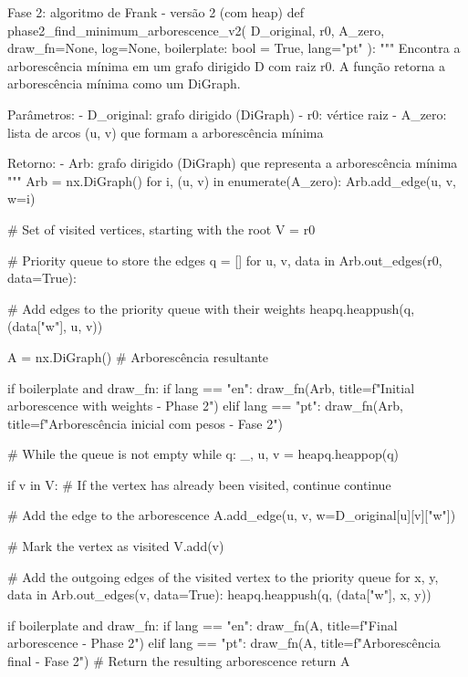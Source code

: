 \begin{pybox}{Fase 2: algoritmo de Frank - versão 2 (com heap)}
	def phase2_find_minimum_arborescence_v2(
	D_original, r0, A_zero, draw_fn=None, log=None, boilerplate: bool = True, lang="pt"
	):
	"""
	Encontra a arborescência mínima em um grafo dirigido D com raiz r0.
	A função retorna a arborescência mínima como um DiGraph.

	Parâmetros:
	- D_original: grafo dirigido (DiGraph)
	- r0: vértice raiz
	- A_zero: lista de arcos (u, v) que formam a arborescência mínima

	Retorno:
	- Arb: grafo dirigido (DiGraph) que representa a arborescência mínima
	"""
	Arb = nx.DiGraph()
	for i, (u, v) in enumerate(A_zero):
	Arb.add_edge(u, v, w=i)

	# Set of visited vertices, starting with the root
	V = {r0}

	# Priority queue to store the edges
	q = []
	for u, v, data in Arb.out_edges(r0, data=True):

	# Add edges to the priority queue with their weights
	heapq.heappush(q, (data["w"], u, v))

	A = nx.DiGraph()  # Arborescência resultante

	if boilerplate and draw_fn:
	if lang == "en":
	draw_fn(Arb, title=f"Initial arborescence with weights - Phase 2")
	elif lang == "pt":
	draw_fn(Arb, title=f"Arborescência inicial com pesos - Fase 2")

	# While the queue is not empty
	while q:
	_, u, v = heapq.heappop(q)

	if v in V:  # If the vertex has already been visited, continue
	continue

	# Add the edge to the arborescence
	A.add_edge(u, v, w=D_original[u][v]["w"])

	# Mark the vertex as visited
	V.add(v)

	# Add the outgoing edges of the visited vertex to the priority queue
	for x, y, data in Arb.out_edges(v, data=True):
	heapq.heappush(q, (data["w"], x, y))

	if boilerplate and draw_fn:
	if lang == "en":
	draw_fn(A, title=f"Final arborescence - Phase 2")
	elif lang == "pt":
	draw_fn(A, title=f"Arborescência final - Fase 2")
	# Return the resulting arborescence
	return A
\end{pybox}


